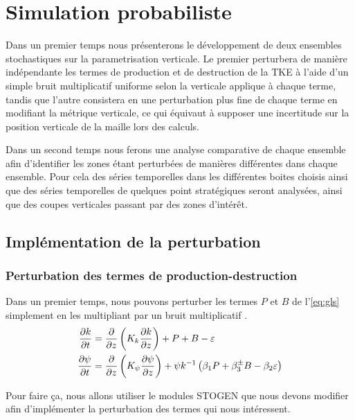 \chapter{Simulation probabiliste}

Dans un premier temps nous présenterons le développement de deux ensembles stochastiques sur la parametrisation verticale. Le premier perturbera de manière indépendante les termes de production et de destruction de la TKE à l'aide d'un simple bruit multiplicatif uniforme selon la verticale applique à chaque terme, tandis que l'autre consistera en une perturbation plus fine de chaque terme en modifiant la métrique verticale, ce qui équivaut à supposer une incertitude sur la position verticale de la maille lors des calculs.

Dans un second temps nous ferons une analyse comparative de chaque ensemble afin d'identifier les zones étant perturbées de manières différentes dans chaque ensemble. Pour cela des séries temporelles dans les différentes boites choisis ainsi que des séries temporelles de quelques point stratégiques seront analysées, ainsi que des coupes verticales passant par des zones d'intérêt.

\section{Implémentation de la perturbation}
\subsection{Perturbation des termes de production-destruction}

Dans un premier temps, nous pouvons perturber les termes $P$ et $B$ de l'\autoref{eq:gls} simplement en les multipliant par un bruit multiplicatif \cite{juricke_stochastic_2017}.
\begin{subequations}
	\begin{align}
		\frac{\partial k}{\partial t} & = \frac{\partial }{\partial z} \left( K_k \frac{\partial k}{\partial z} \right) + P + B - \varepsilon \label{eq:dkdt 2} \\
		\frac{\partial \psi}{\partial t} & = \frac{\partial }{\partial z} \left( K_\psi \frac{\partial \psi}{\partial z} \right) + \psi k^{-1} \left( \beta_1 P + \beta_3^\pm B - \beta_2 \varepsilon \right) \label{eq:dpsidt 2}
	\end{align}
	\label{eq:gls}
\end{subequations}

Pour faire ça, nous allons utiliser le modules STOGEN que nous devons modifier afin d'implémenter la perturbation des termes qui nous intéressent.


